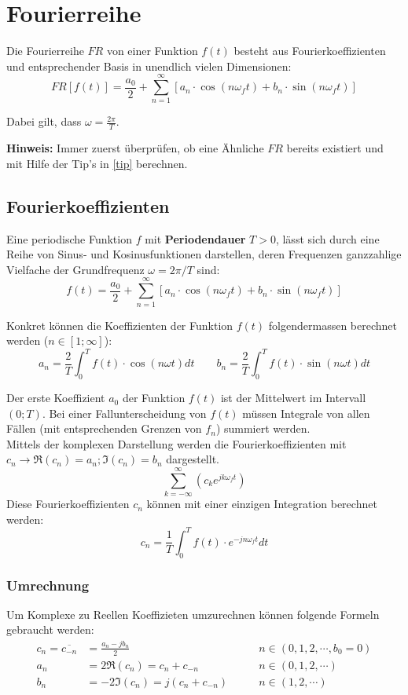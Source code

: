 \section{Fourierreihe}
Die Fourierreihe $FR$ von einer Funktion $f(t)$ besteht aus Fourierkoeffizienten und entsprechender Basis in unendlich vielen Dimensionen:
\[
FR[f(t)] = \frac{a_0}{2} + \sum_{n = 1}^{\infty}[a_n \cdot \cos(n\omega_ft) + b_n \cdot \sin(n\omega_ft)]
\]

\noindent Dabei gilt, dass $\omega = \frac{2\pi}{T}$.

\noindent\textbf{Hinweis:} Immer zuerst überprüfen, ob eine Ähnliche $FR$ bereits existiert und mit Hilfe der Tip's in \ref{tip} berechnen.

\subsection{Fourierkoeffizienten}
Eine periodische Funktion $f$ mit \textbf{Periodendauer} $T > 0$, lässt sich durch eine Reihe von Sinus- und Kosinusfunktionen darstellen,
deren Frequenzen ganzzahlige Vielfache der Grundfrequenz $\omega = 2\pi/T$ sind:
\[f(t) = \frac{a_0}{2} + \sum_{n = 1}^{\infty}[a_n \cdot \cos(n\omega_ft) + b_n \cdot \sin(n\omega_ft)]\]

\noindent Konkret können die Koeffizienten der Funktion $f(t)$ folgendermassen berechnet werden ($n \in [1;\infty]$):
\[
a_n = \frac{2}{T}\int_{0}^{T}f(t) \cdot \cos(n\omega t)dt \qquad b_n = \frac{2}{T}\int_{0}^{T}f(t) \cdot \sin(n\omega t)dt
\]

\noindent Der erste Koeffizient $a_0$ der Funktion $f(t)$ ist der Mittelwert im Intervall $(0; T)$. Bei einer Fallunterscheidung von $f(t)$ müssen Integrale von allen Fällen (mit entsprechenden Grenzen von $f_n$) summiert werden.
~\\

\noindent Mittels der komplexen Darstellung werden die Fourierkoeffizienten mit $c_n \rightarrow \Re(c_n) = a_n; \Im(c_n) = b_n$ dargestellt.
\[
\sum_{k=-\infty}^{\infty}\left(c_ke^{jk\omega_f t}\right)
\]
Diese Fourierkoeffizienten $c_n$ können mit einer einzigen Integration berechnet werden:
\[
c_n = \frac{1}{T} \int_{0}^{T}f(t)\cdot e^{-jn\omega_f t} dt
\]

\subsubsection{Umrechnung}\label{umrechnung}
Um Komplexe zu Reellen Koeffizieten umzurechnen können folgende Formeln gebraucht werden:
\begin{align*}
	c_n = \overline{c_{-n}} &= \frac{a_n - jb_n}{2} &\qquad n \in (0,1,2, \cdots, b_0 = 0) \\
	a_n &= 2\Re(c_n) = c_n + c_{-n}  &\qquad n \in (0,1,2, \cdots) \\
	b_n &= -2\Im(c_n) = j(c_n + c_{-n}) &\qquad n \in (1,2, \cdots) \\
\end{align*}

